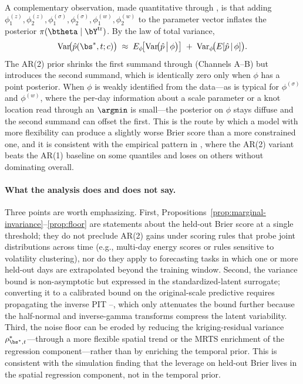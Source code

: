 A complementary observation, made quantitative through , is that adding $\phi_1^{(z)}, \phi_2^{(z)}, \phi_1^{(\sigma)}, \phi_2^{(\sigma)}, \phi_1^{(w)}, \phi_2^{(w)}$ to the parameter vector inflates the posterior $\pi(\btheta \mid \bY^{\mathrm{tr}})$.  By the law of total variance,
\begin{align}
  \mathrm{Var}\!\big(\hat p(\bs^*, t; c)\big)
    \;\approx\; E_\phi\!\big[\mathrm{Var}\!\big(\hat p \,\big|\, \phi\big)\big]
       \;+\; \mathrm{Var}_\phi\!\big(E[\hat p \,|\, \phi]\big).
  \label{eq:total-var-disc}
\end{align}
The AR(2) prior shrinks the first summand through  (Channels A--B) but introduces the second summand, which is identically zero only when $\phi$ has a point posterior.  When $\phi$ is weakly identified from the data---as is typical for $\phi^{(\sigma)}$ and $\phi^{(w)}$, where the per-day information about a scale parameter or a knot location read through an $\argmin$ is small---the posterior on $\phi$ stays diffuse and the second summand can offset the first.  This is the route by which a model with more flexibility can produce a slightly worse Brier score than a more constrained one, and it is consistent with the empirical pattern in , where the AR(2) variant beats the AR(1) baseline on some quantiles and loses on others without dominating overall.

\paragraph{What the analysis does and does not say.}

Three points are worth emphasizing.  First, Propositions~\ref{prop:marginal-invariance}--\ref{prop:floor} are statements about the held-out Brier score at a single threshold; they do not preclude AR(2) gains under scoring rules that probe joint distributions across time (e.g., multi-day energy scores or rules sensitive to volatility clustering), nor do they apply to forecasting tasks in which one or more held-out days are extrapolated beyond the training window.  Second, the variance bound  is non-asymptotic but expressed in the standardized-latent surrogate; converting it to a calibrated bound on the original-scale predictive requires propagating the inverse PIT --, which only attenuates the bound further because the half-normal and inverse-gamma transforms compress the latent variability.  Third, the noise floor  can be eroded by reducing the kriging-residual variance $\rho^*_{\bs^*, t}$---through a more flexible spatial trend or the MRTS enrichment of the regression component---rather than by enriching the temporal prior.  This is consistent with the simulation finding that the leverage on held-out Brier lives in the spatial regression component, not in the temporal prior.
